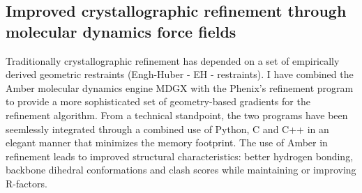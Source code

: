 \documentclass[10.5pt]{article}
\begin{document}
%    


\begin{figure}[H]%
    \centering
    \qquad
\end{figure}
        
        
\subsection*{Improved crystallographic refinement through molecular dynamics force fields}
Traditionally crystallographic refinement has depended on a set of empirically derived geometric restraints (Engh-Huber - EH - restraints). I have combined the Amber molecular dynamics engine MDGX with the Phenix's refinement program to provide a more sophisticated set of geometry-based gradients for the refinement algorithm. From a technical standpoint, the two programs have been seemlessly integrated through a combined use of Python, C and C++ in an elegant manner that minimizes the memory footprint. The use of Amber in refinement leads to improved structural characteristics: better hydrogen bonding, backbone dihedral conformations and clash scores while maintaining or improving R-factors.

\end{document}
